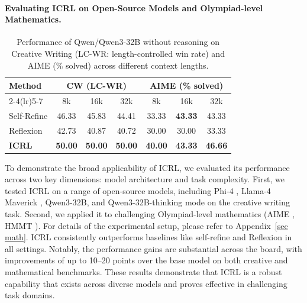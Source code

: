 \documentclass{article} %
\newcommand{\0}{\mathbf{0}}
\begin{document}
\paragraph{Evaluating ICRL on Open-Source Models and Olympiad-level Mathematics.}
\begin{table} %
  \centering
  \small
  \setlength{\tabcolsep}{3pt} %
  \renewcommand{\arraystretch}{1.2} %
  \caption{Performance of Qwen/Qwen3-32B without reasoning on Creative Writing (LC-WR: length-controlled win rate) and AIME (\% solved) across different context lengths.}
  \label{tab:qwen32b_context}
  \begin{tabular}{@{}l|ccc|ccc@{}}
    \toprule
    \multirow{2}{*}{Method} &
    \multicolumn{3}{c|}{CW (LC-WR)} &
    \multicolumn{3}{c}{AIME (\% solved)} \\
    \cmidrule(lr){2-4}\cmidrule(lr){5-7}
    & 8k & 16k & 32k & 8k & 16k & 32k \\
    \midrule
    Self-Refine & 46.33 & 45.83 & 44.41 & 33.33 & \textbf{43.33} & 43.33 \\
    Reflexion   & 42.73 & 40.87 & 40.72 & 30.00 & 30.00 & 33.33 \\
    \textbf{ICRL} & \textbf{50.00} & \textbf{50.00} & \textbf{50.00} &
    \textbf{40.00} & \textbf{43.33} & \textbf{46.66} \\
    \bottomrule
  \end{tabular}
\end{table}
To demonstrate the broad applicability of ICRL, we evaluated its performance across two key dimensions: model architecture and task complexity. First, we tested ICRL on a range of open-source models, including Phi-4 \citep{abdin2024phi4technicalreport}, Llama-4 Maverick \citep{meta2025llama4}, Qwen3-32B, and Qwen3-32B-thinking mode \citep{yang2025qwen3technicalreport} on the creative writing task. Second, we applied it to challenging Olympiad-level mathematics (AIME \citep{aime}, HMMT \citep{hmmt}). For details of the experimental setup, please refer to Appendix~\ref{sec math}. ICRL consistently outperforms baselines like self-refine and Reflexion in all settings. Notably, the performance gains are substantial across the board, with improvements of up to 10--20 points over the base model on both creative and mathematical benchmarks. These results demonstrate that ICRL is a robust capability that exists across diverse models and proves effective in challenging task domains.
\end{document}
